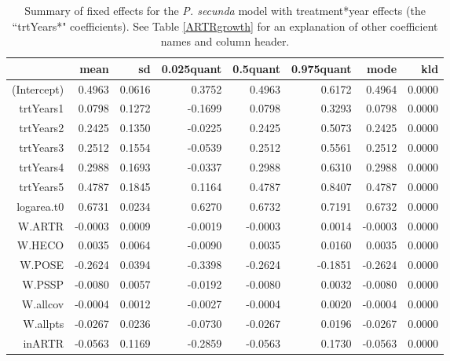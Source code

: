 \documentclass[11pt]{article}
\begin{document}
\begin{table}
\centering
\caption{Summary of fixed effects for the \textit{P. secunda} model with treatment*year effects (the ``trtYears*" coefficients). See Table \ref{ARTRgrowth} for an explanation of other coefficient names and column header.} 
\label{table:POSEgrowth-trtYears}
\begin{tabular}{rrrrrrrr}
  \hline
 & mean & sd & 0.025quant & 0.5quant & 0.975quant & mode & kld \\ 
  \hline
(Intercept) & 0.4963 & 0.0616 & 0.3752 & 0.4963 & 0.6172 & 0.4964 & 0.0000 \\ 
  trtYears1 & 0.0798 & 0.1272 & -0.1699 & 0.0798 & 0.3293 & 0.0798 & 0.0000 \\ 
  trtYears2 & 0.2425 & 0.1350 & -0.0225 & 0.2425 & 0.5073 & 0.2425 & 0.0000 \\ 
  trtYears3 & 0.2512 & 0.1554 & -0.0539 & 0.2512 & 0.5561 & 0.2512 & 0.0000 \\ 
  trtYears4 & 0.2988 & 0.1693 & -0.0337 & 0.2988 & 0.6310 & 0.2988 & 0.0000 \\ 
  trtYears5 & 0.4787 & 0.1845 & 0.1164 & 0.4787 & 0.8407 & 0.4787 & 0.0000 \\ 
  logarea.t0 & 0.6731 & 0.0234 & 0.6270 & 0.6732 & 0.7191 & 0.6732 & 0.0000 \\ 
  W.ARTR & -0.0003 & 0.0009 & -0.0019 & -0.0003 & 0.0014 & -0.0003 & 0.0000 \\ 
  W.HECO & 0.0035 & 0.0064 & -0.0090 & 0.0035 & 0.0160 & 0.0035 & 0.0000 \\ 
  W.POSE & -0.2624 & 0.0394 & -0.3398 & -0.2624 & -0.1851 & -0.2624 & 0.0000 \\ 
  W.PSSP & -0.0080 & 0.0057 & -0.0192 & -0.0080 & 0.0032 & -0.0080 & 0.0000 \\ 
  W.allcov & -0.0004 & 0.0012 & -0.0027 & -0.0004 & 0.0020 & -0.0004 & 0.0000 \\ 
  W.allpts & -0.0267 & 0.0236 & -0.0730 & -0.0267 & 0.0196 & -0.0267 & 0.0000 \\ 
  inARTR & -0.0563 & 0.1169 & -0.2859 & -0.0563 & 0.1730 & -0.0563 & 0.0000 \\ 
   \hline
\end{tabular}
\end{table}
\end{document}
